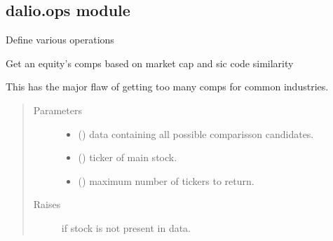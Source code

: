\documentclass[letterpaper,10pt,english]{sphinxmanual}
\begin{document}
\subsection{dalio.ops module}
\label{\detokenize{dalio.ops:module-dalio.ops}}\label{\detokenize{dalio.ops:dalio-ops-module}}\label{\detokenize{dalio.ops::doc}}
Define various operations

\begin{fulllineitems}
\label{\detokenize{dalio.ops:dalio.ops.get_comps_by_sic}}
Get an equity’s comps based on market cap and sic code similarity

This has the major flaw of getting too many comps for common industries.
\begin{quote}\begin{description}
\item[{Parameters}] \leavevmode\begin{itemize}
\item {} 
 () \textendash{} data containing all possible comparisson
candidates.

\item {} 
 () \textendash{} ticker of main stock.

\item {} 
 () \textendash{} maximum number of tickers to return.

\end{itemize}

\item[{Raises}] \leavevmode
{} \textendash{} if stock is not present in data.

\end{description}\end{quote}

\end{fulllineitems}

\end{document}

